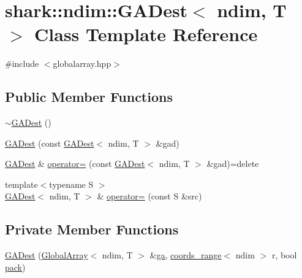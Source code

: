 \hypertarget{classshark_1_1ndim_1_1_g_a_dest}{}\section{shark\+:\+:ndim\+:\+:G\+A\+Dest$<$ ndim, T $>$ Class Template Reference}
\label{classshark_1_1ndim_1_1_g_a_dest}


{\ttfamily \#include $<$globalarray.\+hpp$>$}

\subsection*{Public Member Functions}
\begin{DoxyCompactItemize}
\item 
\hyperlink{classshark_1_1ndim_1_1_g_a_dest_a65b5bbfe74c714882a0469d62d0dd355}{$\sim$\+G\+A\+Dest} ()
\item 
\hyperlink{classshark_1_1ndim_1_1_g_a_dest_a349841f3baadf92afdb6c41198f1c36c}{G\+A\+Dest} (const \hyperlink{classshark_1_1ndim_1_1_g_a_dest}{G\+A\+Dest}$<$ ndim, T $>$ \&gad)
\item 
\hyperlink{classshark_1_1ndim_1_1_g_a_dest}{G\+A\+Dest} \& \hyperlink{classshark_1_1ndim_1_1_g_a_dest_ab6632790b5f89a3a19a24a4bf2988e01}{operator=} (const \hyperlink{classshark_1_1ndim_1_1_g_a_dest}{G\+A\+Dest}$<$ ndim, T $>$ \&gad)=delete
\item 
{\footnotesize template$<$typename S $>$ }\\\hyperlink{classshark_1_1ndim_1_1_g_a_dest}{G\+A\+Dest}$<$ ndim, T $>$ \& \hyperlink{classshark_1_1ndim_1_1_g_a_dest_af05507ececbff5564c7ee32aa28918f6}{operator=} (const S \&src)
\end{DoxyCompactItemize}
\subsection*{Private Member Functions}
\begin{DoxyCompactItemize}
\item 
\hyperlink{classshark_1_1ndim_1_1_g_a_dest_a5da867cbd42503f33eb5b824f18926af}{G\+A\+Dest} (\hyperlink{classshark_1_1ndim_1_1_global_array}{Global\+Array}$<$ ndim, T $>$ \&\hyperlink{classshark_1_1ndim_1_1_g_a_dest_aa64cb1bd1f2155c6cca997e4ba69760e}{ga}, \hyperlink{structshark_1_1ndim_1_1coords__range}{coords\+\_\+range}$<$ ndim $>$ r, bool \hyperlink{classshark_1_1ndim_1_1_g_a_dest_aeef6b8ca8d9d57db09b32949e0493aca}{pack})
\end{DoxyCompactItemize}
